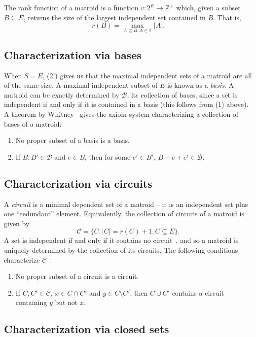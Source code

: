 The rank function of a matroid is a function $v:2^E \to \mathbb{Z}^+$ which, given a subset $B\subseteq E$, returns the size of the largest independent set contained in $B$. That is, $$r(B) = \max_{A \subseteq B, A\in \mathcal{I}}|A|.$$

\subsection{Characterization via bases} When $S=E$, (2') gives us that the maximal independent sets of a matroid are all of the same size. A maximal independent subset of $E$ is known as a \textit{basis}. A matroid can be exactly determined by $\mathcal{B}$, its collection of bases, since a set is independent if and only if it is contained in a basis (this follows from (1) above). A theorem by Whitney~\cite{whitney-1935} gives the axiom system characterizing a collection of bases of a matroid: 
\begin{enumerate}
  \item No proper subset of a basis is a basis.
  \item If $B, B'\in \mathcal{B}$ and $e \in B$, then for some $e'\in B'$, $B-e+e'\in\mathcal{B}$.
\end{enumerate}

\subsection{Characterization via circuits}
A \textit{circuit} is a minimal dependent set of a matroid -- it is an independent set plus one ``redundant'' element. Equivalently, the collection of circuits of a matroid is given by
$$\mathcal{C} = \bigl\{ C : |C| = r(C) + 1, C\subseteq E \bigr\}.$$
A set is independent if and only if it contains no circuit~\cite{schrijver-2003}, and so a matroid is uniquely determined by the collection of its circuits. The following conditions characterize $\mathcal{C}$~\cite{whitney-1935}:
\begin{enumerate}
  \item No proper subset of a circuit is a circuit.
  \item If $C, C'\in\mathcal{C}$, $x\in C\cap C'$ and $y\in C\setminus C'$, then $C\cup C'$ contains a circuit containing $y$ but not $x$.
\end{enumerate}

\subsection{Characterization via closed sets}

